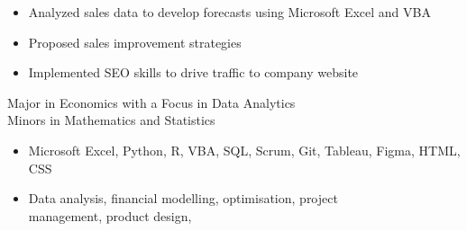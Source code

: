 \documentclass[10pt,a4paper,ragged2e]{altacv}
\begin{document}
\divider

\begin{itemize}
    \item Analyzed sales data to develop forecasts using Microsoft Excel and VBA
    \item Proposed sales improvement strategies
    \item Implemented SEO skills to drive traffic to company website
\end{itemize}

Major in Economics with a Focus in Data Analytics \\ Minors in Mathematics and Statistics


\begin{itemize}
    \item Microsoft Excel, Python, R, VBA, SQL, Scrum, Git, Tableau, Figma, HTML, CSS
    \item Data analysis, financial modelling, optimisation, project \\management, product design,
\end{itemize}

\clearpage
\nocite{*}
\end{document}
